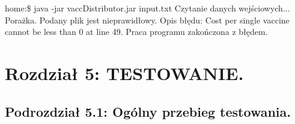 \documentclass[a4paper]{article}
\begin{document}
\begin{tcolorbox}
home:\$	java -jar vaccDistributor.jar input.txt
\newline Czytanie danych wejściowych... Porażka. Podany plik jest nieprawidłowy.
\newline Opis błędu: Cost per single vaccine cannot be less than 0 at line 49.
\newline 
\newline Praca programu zakończona z błędem.
\end{tcolorbox}

\section*{Rozdział 5: TESTOWANIE.}
\subsection*{Podrozdział 5.1: Ogólny przebieg testowania.}
\end{document}
